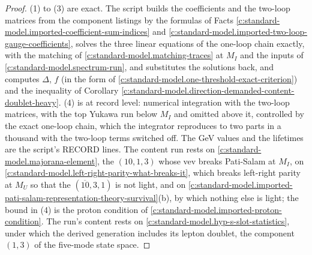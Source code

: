 \documentclass[11pt]{article}
\theoremstyle{definition}
\theoremstyle{plain}
\providecommand{\Dl}{}\renewcommand{\Dl}{\Delta}
\begin{document}
\begin{proof}
(1) to (3) are exact. The script builds the coefficients and the two-loop matrices from the component listings by the formulas of Facts \ref{c:standard-model.imported-coefficient-sum-indices} and \ref{c:standard-model.imported-two-loop-gauge-coefficients}, solves the three linear equations of the one-loop chain exactly, with the matching of \ref{c:standard-model.matching-traces} at $M_{I}$ and the inputs of \ref{c:standard-model.spectrum-run}, and substitutes the solutions back, and computes $\Dl$, $f$ (in the form of \ref{c:standard-model.one-threshold-exact-criterion}) and the inequality of Corollary \ref{c:standard-model.direction-demanded-content-doublet-heavy}. (4) is at record level: numerical integration with the two-loop matrices, with the top Yukawa run below $M_{I}$ and omitted above it, controlled by the exact one-loop chain, which the integrator reproduces to two parts in a thousand with the two-loop terms switched off. The GeV values and the lifetimes are the script's RECORD lines. The content run rests on \ref{c:standard-model.majorana-element}, the $(10,1,3)$ whose vev breaks Pati-Salam at $M_{I}$, on \ref{c:standard-model.left-right-parity-what-breaks-it}, which breaks left-right parity at $M_{U}$ so that the $(\overline{10},3,1)$ is not light, and on \ref{c:standard-model.imported-pati-salam-representation-theory-survival}(b), by which nothing else is light; the bound in (4) is the proton condition of \ref{c:standard-model.imported-proton-condition}. The run's content rests on \ref{c:standard-model.hyp-s-slot-statistics}, under which the derived generation includes its lepton doublet, the component $(1,3)$ of the five-mode state space.

\end{proof}
\end{document}

